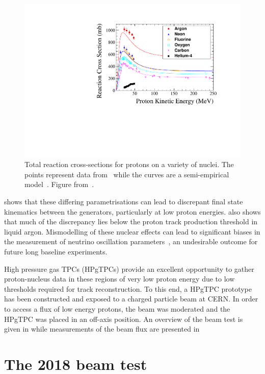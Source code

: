 \begin{figure}[h]
  \centering
  \includegraphics[width=.8\linewidth]{files/figures/hptpc_beam_flux/DataProtonCrossSections}
  \caption[Proton-nucleus cross-section data compared with a semi-empirical model]{Total reaction cross-sections for protons on a variety of nuclei. The points represent data from~\cite{protonXSecData} while the curves are a semi-empirical model~\cite{protonXSecModel}. Figure from~\cite{hptpcProposal}.}
  \label{fig:protonNucleus}
\end{figure}

 shows that these differing parametrisations can lead to discrepant final state kinematics between the generators, particularly at low proton energies.
 also shows that much of the discrepancy lies below the proton track production threshold in liquid argon.
Mismodelling of these nuclear effects can lead to significant biases in the measurement of neutrino oscillation parameters~\cite{nuclearMismodelOsc}, an undesirable outcome for future long baseline experiments.


High pressure gas TPCs (HPgTPCs) provide an excellent opportunity to gather proton-nucleus data in these regions of very low proton energy due to low thresholds required for track reconstruction.
To this end, a HPgTPC prototype has been constructed and exposed to a charged particle beam at CERN.
In order to access a flux of low energy protons, the beam was moderated and the HPgTPC was placed in an off-axis position. 
An overview of the beam test is given in  while measurements of the beam flux are presented in 

\section{The 2018 beam test}
\label{sec:hptpc_beam_flux:overview}


